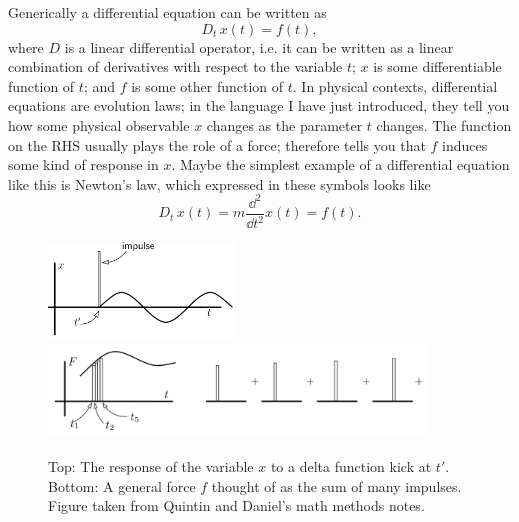 Generically a differential equation can be written as
\begin{equation}\label{eq:diffyq}
  D_t\,x(t) = f(t),
\end{equation}
where $D$ is a linear differential operator, i.e. it can be written as
a linear combination of derivatives with respect to the variable $t$;
$x$ is some differentiable function of $t$; and $f$ is some other
function of $t$. In physical contexts, differential equations are
evolution laws; in the language I have just introduced, they tell you
how some physical observable $x$ changes as the parameter $t$ changes.
The function on the RHS usually plays the role of a force; therefore
 tells you that $f$ induces some kind of response in 
$x$. Maybe the simplest example of a differential equation like this
is Newton's law, which expressed in these symbols looks like
\begin{equation}
  D_t\,x(t)=m\frac{\dd^2}{\dd t^2}x(t) = f(t).
\end{equation}

\begin{figure}
\centering
\includegraphics[width=0.44\textwidth]{figs/impulse.png}\\
\includegraphics[width=0.90\textwidth]{figs/manyimpulses.png}
\caption{Top: The response of the variable $x$ to a delta function kick at 
$t'$. Bottom: A general force $f$ thought of as the sum of many impulses.
Figure taken from Quintin and Daniel's math methods notes.}
\label{fig:impulse}
\end{figure}

